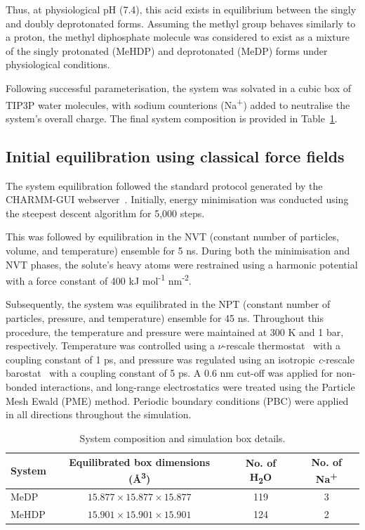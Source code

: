 Thus, at physiological pH (7.4), this acid exists in equilibrium between the singly and doubly deprotonated forms. Assuming the methyl group behaves similarly to a proton, the methyl diphosphate molecule was considered to exist as a mixture of the singly protonated (MeHDP) and deprotonated (MeDP) forms under physiological conditions.

Following successful parameterisation, the system was solvated in a cubic box of TIP3P water molecules, with sodium counterions (Na\textsuperscript{+}) added to neutralise the system's overall charge. The final system composition is provided in Table~\ref{tab:system-before-equilibration}.



\subsection{Initial equilibration using classical force fields}
The system equilibration followed the standard protocol generated by the CHARMM-GUI webserver~\citep{joCHARMMGUIWebbasedGraphical2008}. Initially, energy minimisation was conducted using the steepest descent algorithm for 5,000 steps.

This was followed by equilibration in the NVT (constant number of particles, volume, and temperature) ensemble for 5 ns. During both the minimisation and NVT phases, the solute's heavy atoms were restrained using a harmonic potential with a force constant of 400 kJ mol\textsuperscript{-1} nm\textsuperscript{-2}.

Subsequently, the system was equilibrated in the NPT (constant number of particles, pressure, and temperature) ensemble for 45 ns. Throughout this procedure, the temperature and pressure were maintained at 300 K and 1 bar, respectively. Temperature was controlled using a $\nu$-rescale thermostat~\citep{bussiCanonicalSamplingVelocity2007} with a coupling constant of 1 ps, and pressure was regulated using an isotropic \textit{c}-rescale barostat~\citep{bernettiPressureControlUsing2020} with a coupling constant of 5 ps. A 0.6 nm cut-off was applied for non-bonded interactions, and long-range electrostatics were treated using the Particle Mesh Ewald (PME) method. Periodic boundary conditions (PBC) were applied in all directions throughout the simulation.

\begin{table}[b]
    \centering
    \caption{System composition and simulation box details.}
    \label{tab:system-before-equilibration}
    \begin{tabular}{lccc}
    \toprule
    \textbf{System} & \textbf{Equilibrated box dimensions (\AA\textsuperscript{3})} & \textbf{No. of H\textsubscript{2}O} & \textbf{No. of Na\textsuperscript{+}} \\
    \midrule
    MeDP  & $15.877 \times 15.877 \times 15.877$ & 119 & 3 \\
    MeHDP & $15.901 \times 15.901 \times 15.901$ & 124 & 2 \\
    \bottomrule
    \end{tabular}
\end{table}

